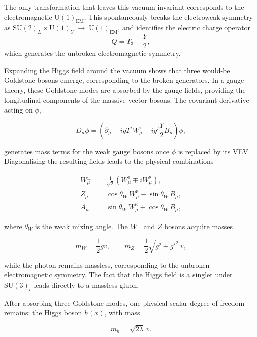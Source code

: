 The only transformation that leaves this vacuum invariant corresponds to the electromagnetic $\mathrm{U}(1)_{\mathrm{EM}}$. 
This spontaneously breaks the electroweak symmetry as $\mathrm{SU}(2)_L \times \mathrm{U}(1)_Y \;\rightarrow\; \mathrm{U}(1)_{\mathrm{EM}}$, 
and identifies the electric charge operator 
\[
Q = T_{3} + \frac{Y}{2},
\]
which generates the unbroken electromagnetic symmetry.

Expanding the Higgs field around the vacuum shows that three would-be Goldstone bosons emerge, corresponding to the broken generators. 
In a gauge theory, these Goldstone modes are absorbed by the gauge fields, providing the longitudinal components of the massive vector bosons. 
The covariant derivative acting on $\phi$,

\begin{equation}
    D_\mu \phi
    = \left( \partial_\mu 
    - i g T^i W_\mu^i
    - i g' \frac{Y}{2} B_\mu \right) \phi,
\end{equation}

generates mass terms for the weak gauge bosons once $\phi$ is replaced by its VEV. 
Diagonalising the resulting fields leads to the physical combinations

\begin{align}
    W_\mu^\pm &= \frac{1}{\sqrt{2}} (W_\mu^1 \mp i W_\mu^2), \\
    Z_\mu &= \cos\theta_W\, W_\mu^3 - \sin\theta_W\, B_\mu, \\
    A_\mu &= \sin\theta_W\, W_\mu^3 + \cos\theta_W\, B_\mu,
\end{align}

where $\theta_W$ is the weak mixing angle. 
The $W^\pm$ and $Z$ bosons acquire masses

\begin{equation}
    m_W = \frac{1}{2} g v, 
    \qquad
    m_Z = \frac{1}{2}\sqrt{g^2 + g'^2}\, v,
\end{equation}

while the photon remains massless, corresponding to the unbroken electromagnetic symmetry.
The fact that the Higgs field is a singlet under $\mathrm{SU}(3)_c$ leads directly to a massless gluon.

After absorbing three Goldstone modes, one physical scalar degree of freedom remains: the Higgs boson $h(x)$, with mass

\begin{equation}
    m_h = \sqrt{2\lambda}\, v.
\end{equation}

